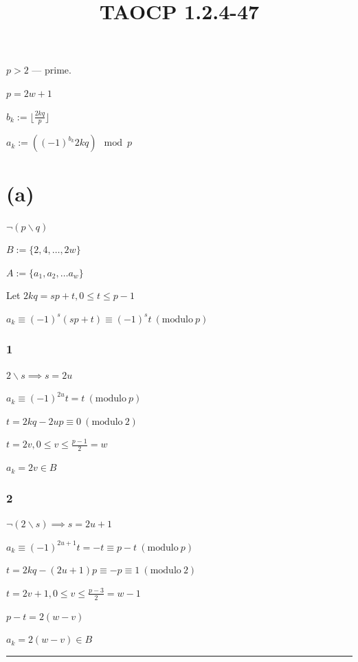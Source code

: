 \documentclass{article}
\title{TAOCP 1.2.4\mbox{-}47}
\begin{document}
\maketitle

\( p > 2 \) --- prime.

\( p = 2 w + 1 \)

\( b_{k} := \lfloor{\frac{2kq}{p}}\rfloor \)

\( a_{k} := ({(-1)}^{b_{k}} 2kq) \mod p \)

\section*{(a)}

\( \lnot(p \backslash q) \)

\( B := \{ 2, 4, \ldots, 2w \} \)

\( A := \{ a_{1}, a_{2}, \ldots a_{w} \} \)

Let \( 2kq = sp + t, 0 \leq t \leq p - 1 \)

\( a_{k} \equiv {(-1)}^{s}(sp+t) \equiv {(-1)}^{s} t \ (\mathrm{modulo}\ p) \)

\subsubsection*{1}

\( 2 \backslash s \implies s = 2u \)

\( a_{k} \equiv {(-1)}^{2u} t = t \ (\mathrm{modulo}\ p) \)

\( t = 2kq - 2up \equiv 0 \ (\mathrm{modulo}\ 2) \)

\( t = 2v, 0 \leq v \leq \frac{p-1}{2} = w \)

\( a_{k} = 2v \in B \)

\subsubsection*{2}

\( \lnot(2 \backslash s) \implies s = 2u + 1 \)

\( a_{k} \equiv {(-1)}^{2u+1} t = -t \equiv p - t \ (\mathrm{modulo}\ p) \)

\( t = 2kq - (2u+1)p \equiv -p \equiv 1 \ (\mathrm{modulo}\ 2) \)

\( t = 2v + 1, 0 \leq v \leq \frac{p-3}{2} = w - 1 \)

\( p - t = 2 (w - v) \)

\( a_{k} = 2(w-v) \in B \)

\bigskip\hrule\bigskip
\end{document}
